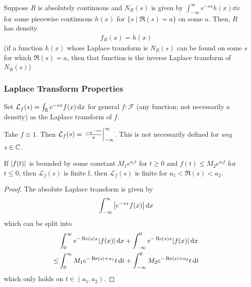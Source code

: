 \begin{theorem}
    Suppose $R$ is absolutely continuous and $N_R(s)$ is given by $\int_{-\infty}^\infty e^{-sx} h(x) \dd{x}$ for some piecewise continuous $h(x)$ for $\{ s \mid \Re(s) = a\}$ on some $a$. Then, $R$ has density
    \begin{align}
        f_R(x) = h(x)
    \end{align}
    (if a function $h(x)$ whose Laplace transform is $N_R(s)$ can be found on some $s$ for which $\Re(s) = a$, then that function is the inverse Laplace transform of $N_R(s)$)
\end{theorem}

\subsubsection{Laplace Transform Properties}
Set $\mathcal{L}_f(s) = \int_{\mathbb{R}} e^{-sx} f(x) \dd{x}$ for general $f: \mathcal{F}$ (any function; not necessarily a density) as the Laplace transform of $f$.
\begin{aside}
    Take $f \equiv 1$. Then $\mathcal{L}_f(s) = \eval{\frac{-e^{-sx}}{s}}_{-\infty}^\infty$. This is not necessarily defined for \textit{any} $s \in \mathbb{C}$.
\end{aside}
\begin{lemma}
    If $\abs{f(t)}$ is bounded by some constant $M_1 e^{a_1t}$ for $t \ge 0$ and $f(t) \le M_2 e^{a_2 t}$ for $t \le 0$, then $\mathcal{L}_f(s)$ is finite f, then $\mathcal{L}_f(s)$ is finite for $a_1 < \Re(s) < a_2$.
\end{lemma}
\begin{proof}
    The absolute Laplace transform is given by
    \begin{align}
        \int_{-\infty}^\infty \abs{e^{-sx} f(x)} \dd{x}
    \end{align}
    which can be split into
    \begin{align}
        & \int_{0}^\infty e^{-\Re(s)x} \abs{f(x)} \dd{x} + \int_{-\infty}^0 e^{-\Re(s)x} \abs{f(x)} \dd{x}\\
        \le & \int_0^\infty M_1 e^{-\Re(s) + a_1}t \dd{t} + \int_{-\infty}^0 M_2 e^{-\Re(s) + a_2}t \dd{t}
    \end{align}
    which only holds on $t \in (a_1,a_2)$.
\end{proof}

